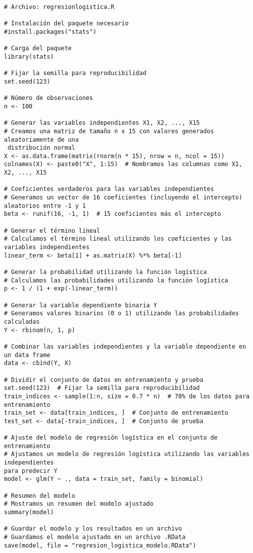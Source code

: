 \begin{verbatim}
# Archivo: regresionlogistica.R

# Instalación del paquete necesario
#install.packages("stats")

# Carga del paquete
library(stats)

# Fijar la semilla para reproducibilidad
set.seed(123)

# Número de observaciones
n <- 100

# Generar las variables independientes X1, X2, ..., X15
# Creamos una matriz de tamaño n x 15 con valores generados aleatoriamente de una
 distribución normal
X <- as.data.frame(matrix(rnorm(n * 15), nrow = n, ncol = 15))
colnames(X) <- paste0("X", 1:15)  # Nombramos las columnas como X1, X2, ..., X15

# Coeficientes verdaderos para las variables independientes
# Generamos un vector de 16 coeficientes (incluyendo el intercepto) aleatorios entre -1 y 1
beta <- runif(16, -1, 1)  # 15 coeficientes más el intercepto

# Generar el término lineal
# Calculamos el término lineal utilizando los coeficientes y las variables independientes
linear_term <- beta[1] + as.matrix(X) %*% beta[-1]

# Generar la probabilidad utilizando la función logística
# Calculamos las probabilidades utilizando la función logística
p <- 1 / (1 + exp(-linear_term))

# Generar la variable dependiente binaria Y
# Generamos valores binarios (0 o 1) utilizando las probabilidades calculadas
Y <- rbinom(n, 1, p)

# Combinar las variables independientes y la variable dependiente en un data frame
data <- cbind(Y, X)

# Dividir el conjunto de datos en entrenamiento y prueba
set.seed(123)  # Fijar la semilla para reproducibilidad
train_indices <- sample(1:n, size = 0.7 * n)  # 70% de los datos para entrenamiento
train_set <- data[train_indices, ]  # Conjunto de entrenamiento
test_set <- data[-train_indices, ]  # Conjunto de prueba

# Ajuste del modelo de regresión logística en el conjunto de entrenamiento
# Ajustamos un modelo de regresión logística utilizando las variables independientes
para predecir Y
model <- glm(Y ~ ., data = train_set, family = binomial)

# Resumen del modelo
# Mostramos un resumen del modelo ajustado
summary(model)

# Guardar el modelo y los resultados en un archivo
# Guardamos el modelo ajustado en un archivo .RData
save(model, file = "regresion_logistica_modelo.RData")


\end{verbatim}
